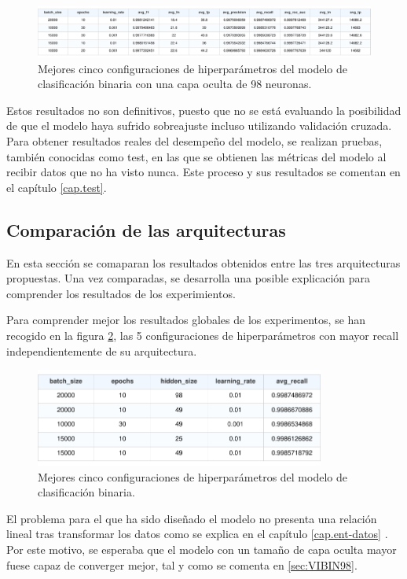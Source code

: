 \begin{figure}[H]
    \centering
    \includegraphics[width=1\textwidth]{./img/modelo/BINhs98.pdf}
    \caption{Mejores cinco configuraciones de hiperparámetros del modelo de clasificación binaria con una capa oculta de 98 neuronas.}
    \label{fig:BINhs98}
\end{figure}

Estos resultados no son definitivos, puesto que no se está evaluando la posibilidad de que el modelo haya sufrido sobreajuste incluso utilizando validación cruzada. Para obtener resultados reales del desempeño del modelo, se realizan pruebas, también conocidas como test, en las que se obtienen las métricas del modelo al recibir datos que no ha visto nunca. Este proceso y sus resultados se comentan en el capítulo \ref{cap.test}.


\subsection{Comparación de las arquitecturas}
En esta sección se comaparan los resultados obtenidos entre las tres arquitecturas propuestas. Una vez comparadas, se desarrolla una posible explicación para comprender los resultados de los experimientos.

Para comprender mejor los resultados globales de los experimentos, se han recogido en la figura \ref{fig:BINtop5}, las 5 configuraciones de hiperparámetros con mayor recall independientemente de su arquitectura.

\begin{figure}[H]
    \centering
    \includegraphics[width=0.85\textwidth]{./img/modelo/BINtop5.pdf}
    \caption{Mejores cinco configuraciones de hiperparámetros del modelo de clasificación binaria.}
    \label{fig:BINtop5}
\end{figure}

El problema para el que ha sido diseñado el modelo no presenta una relación lineal tras transformar los datos como se explica en el capítulo \ref{cap.ent-datos} . Por este motivo, se esperaba que el modelo con un tamaño de capa oculta mayor fuese capaz de converger mejor, tal y como se comenta en \ref{sec:VIBIN98}.

